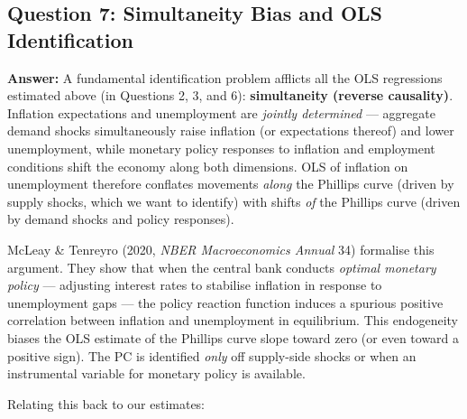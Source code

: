 \documentclass[
  12pt,
]{article}
\begin{document}
\hypertarget{question-7-simultaneity-bias-and-ols-identification}{%
\subsection{Question 7: Simultaneity Bias and OLS
Identification}\label{question-7-simultaneity-bias-and-ols-identification}}

\textbf{Answer:} A fundamental identification problem afflicts all the
OLS regressions estimated above (in Questions 2, 3, and 6):
\textbf{simultaneity (reverse causality)}. Inflation expectations and
unemployment are \emph{jointly determined} --- aggregate demand shocks
simultaneously raise inflation (or expectations thereof) and lower
unemployment, while monetary policy responses to inflation and
employment conditions shift the economy along both dimensions. OLS of
inflation on unemployment therefore conflates movements \emph{along} the
Phillips curve (driven by supply shocks, which we want to identify) with
shifts \emph{of} the Phillips curve (driven by demand shocks and policy
responses).

McLeay \& Tenreyro (2020, \emph{NBER Macroeconomics Annual} 34)
formalise this argument. They show that when the central bank conducts
\emph{optimal monetary policy} --- adjusting interest rates to stabilise
inflation in response to unemployment gaps --- the policy reaction
function induces a spurious positive correlation between inflation and
unemployment in equilibrium. This endogeneity biases the OLS estimate of
the Phillips curve slope toward zero (or even toward a positive sign).
The PC is identified \emph{only} off supply-side shocks or when an
instrumental variable for monetary policy is available.

Relating this back to our estimates:
\end{document}
